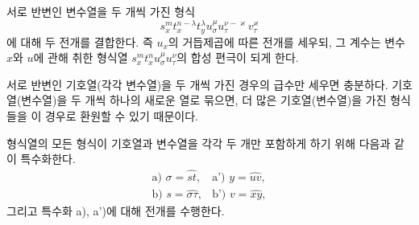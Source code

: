 
서로 반변인 변수열을 두 개씩 가진 형식
\[
s_x^m t_x^{n-\lambda}t_y^\lambda u_\sigma^\mu u_\tau^{\nu-\varkappa}v_\tau^\varkappa
\]
에 대해 두 전개를 결합한다. 즉 $u_x$의 거듭제곱에 따른 전개를 세우되, 그 계수는 변수 $x$와 $u$에 관해 취한 형식열 $s_x^m t_x^n u_\sigma^\mu u_\tau^\nu$의 합성 편극이 되게 한다.

서로 반변인 기호열(각각 변수열)을 두 개씩 가진 경우의 급수만 세우면 충분하다. 기호열(변수열)을 두 개씩 하나의 새로운 열로 묶으면, 더 많은 기호열(변수열)을 가진 형식들을 이 경우로 환원할 수 있기 때문이다.

형식열의 모든 형식이 기호열과 변수열을 각각 두 개만 포함하게 하기 위해 다음과 같이 특수화한다.
\[
\begin{array}{ll}
\text{a) } \sigma=\widehat{st}, & \text{a') } y=\widehat{uv},\\[0.3em]
\text{b) } s=\widehat{\sigma\tau}, & \text{b') } v=\widehat{xy},
\end{array}
\]
그리고 특수화 a), a')에 대해 전개를 수행한다.

